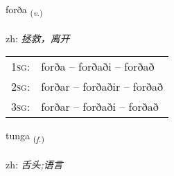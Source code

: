 \documentclass[frontgrid, backgrid]{flacards}\usepackage[]{graphicx}\usepackage[]{color}
\begin{document}
{forða \small{\textsubscript{(\textit{v.})}} \\[1ex] %
\textphonetic{[fɔrða]} \\
zh: \emph{拯救，离开} \\  [2ex]
\renewcommand*{\arraystretch}{0.8}
\begin{tabular}{p{1cm}l}
\textsc{1sg}: & forða -- forðaði -- forðað \\ 
\textsc{2sg}: & forðar -- forðaðir -- forðað \\ 
\textsc{3sg}: & forðar -- forðaði -- forðað \\ 
\end{tabular}
}

\renewcommand{\flhead}{\vskip5pt \fboxsep=0pt {\small\bfseries\footnotesize Nafnorð | 名词}}
\renewcommand{\fcfoot}{\vskip5pt \fboxsep=0pt \hspace{2pt}{\small\bfseries\footnotesize 2K}}

\renewcommand{\blhead}{\vskip5pt {\small\bfseries\footnotesize Nafnorð | 名词 }}
\renewcommand{\bcfoot}{\vskip5pt \hspace{2pt}{\small\bfseries\footnotesize 2K}}


{tunga \small{\textsubscript{(\textit{f.})}} \\[1ex] %
\textphonetic{[tʰuŋka]} \\
zh: \emph{舌头;语言} \\  [2ex]
\renewcommand*{\arraystretch}{0.8}
}

\renewcommand{\flhead}{\vskip5pt \fboxsep=0pt {\small\bfseries\footnotesize Nafnorð | 名词}}
\renewcommand{\fcfoot}{\vskip5pt \fboxsep=0pt \hspace{2pt}{\small\bfseries\footnotesize 2K}}
\end{document}
